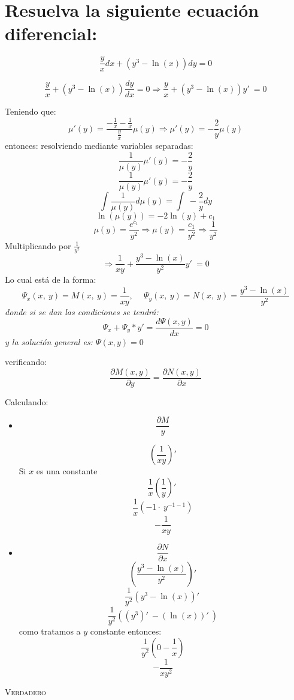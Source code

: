 \section{Resuelva la siguiente ecuación diferencial:}
\[ \frac{y}{x}dx+\left(y^3-\ln \left(x\right)\right)dy=0 \]

$$ \frac{y}{x}+\left(y^3-\ln \left(x\right)\right)\frac{dy}{dx}=0 \Rightarrow \frac{y}{x}+\left(y^3-\ln \left(x\right)\right)y'\:=0 $$

Teniendo que:
$$\mu '\left(y\right)=\frac{-\frac{1}{x}-\frac{1}{x}}{\frac{y}{x}}\mu \left(y\right)\Rightarrow \mu'\left(y\right)=-\frac{2}{y}\mu\left(y\right)$$
entonces: resolviendo mediante variables separadas:
$$\frac{1}{\mu\left(y\right)}\mu'\left(y\right)=-\frac{2}{y}$$
$$\frac{1}{\mu\left(y\right)}\mu'\left(y\right)=-\frac{2}{y}$$
$$\int \frac{1}{\mu\left(y\right)}d\mu\left(y\right)=\int \:-\frac{2}{y}dy$$
$$\ln \left(\mu\left(y\right)\right)=-2\ln \left(y\right)+c_1$$
$$\mu\left(y\right)=\frac{e^{c_1}}{y^2}\Rightarrow \mu\left(y\right)=\frac{c_1}{y^2}\Rightarrow \frac{1}{y^2}$$
Multiplicando por $\frac{1}{y^2}$
$$\Rightarrow \frac{1}{xy}+\frac{y^3-\ln \left(x\right)}{y^2}y'\:=0$$
Lo cual está de la forma:
$$\Psi _x\left(x,\:y\right)=M\left(x,\:y\right)=\frac{1}{xy},\:\quad \Psi _y\left(x,\:y\right)=N\left(x,\:y\right)=\frac{y^3-\ln \left(x\right)}{y^2}$$
\textit{donde si se dan las condiciones se tendrá:
$$\Psi_x+\Psi_y*y'=\frac{d\Psi(x,y)}{dx}=0$$
y la solución general es: $\Psi(x,y)=0$}

verificando:
$$\frac{\partial M(x,y)}{\partial y}=\frac{\partial N(x,y)}{\partial x}$$

Calculando:
\begin{itemize}
    \item $$\frac{\partial M}{y}$$
    
         $$\left(\frac{1}{xy}\right)'$$
         Si $x$ es una constante
         $$\frac{1}{x}\left(\frac{1}{y}\right)'\:$$
         $$\frac{1}{x}\left(-1\cdot \:y^{-1-1}\right)$$ $$-\frac{1}{xy}$$
    \item $$\frac{\partial N}{\partial x}$$
          $$\left(\frac{y^3-\ln \left(x\right)}{y^2}\right)'$$
          $$\frac{1}{y^2}\left(y^3-\ln \left(x\right)\right)'\:$$
          $$\frac{1}{y^2}\left(\left(y^3\right)'\:-\left(\ln \left(x\right)\right)'\:\right)$$
          como tratamos a $y$ constante entonces:
          $$\frac{1}{y^2}\left(0-\frac{1}{x}\right)$$
          $$-\frac{1}{xy^2}$$
\end{itemize}
\textsc{ Verdadero }

